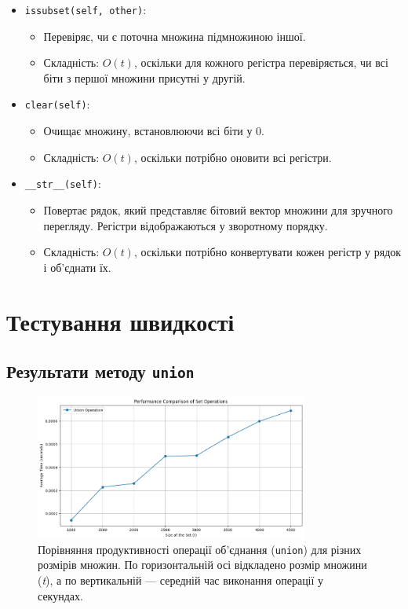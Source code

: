 \documentclass[a4paper,12pt]{article}
\begin{document}
\begin{itemize}
    \item \texttt{issubset(self, other)}:
    \begin{itemize}
        \item Перевіряє, чи є поточна множина підмножиною іншої.
        \item Складність: $O(t)$, оскільки для кожного регістра перевіряється, чи всі біти з першої множини присутні у другій.
    \end{itemize}

    \item \texttt{clear(self)}:
    \begin{itemize}
        \item Очищає множину, встановлюючи всі біти у 0.
        \item Складність: $O(t)$, оскільки потрібно оновити всі регістри.
    \end{itemize}

    \item \texttt{\_\_str\_\_(self)}:
    \begin{itemize}
        \item Повертає рядок, який представляє бітовий вектор множини для зручного перегляду. Регістри відображаються у зворотному порядку.
        \item Складність: $O(t)$, оскільки потрібно конвертувати кожен регістр у рядок і об'єднати їх.
    \end{itemize}
\end{itemize}
\newpage

\section{Тестування швидкості} 

\subsection{Результати методу \texttt{union}}
\begin{figure}[h!]
\centering
\includegraphics[width=0.8\textwidth]{img/Union.png}
\caption{Порівняння продуктивності операції об'єднання (\texttt{union}) для різних розмірів множин. По горизонтальній осі відкладено розмір множини (\textit{t}), а по вертикальній — середній час виконання операції у секундах.}
\label{fig:union}
\end{figure}
\end{document}
